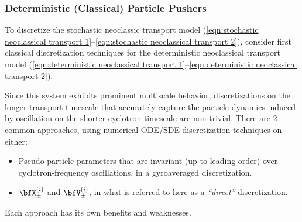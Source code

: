 \subsubsection{Deterministic (Classical) Particle Pushers}
    To discretize the stochastic neoclassic transport model (\ref{eqn:stochastic neoclassical transport 1}--\ref{eqn:stochastic neoclassical transport 2}), consider first classical discretization techniques for the deterministic neoclassical transport model (\ref{eqn:deterministic neoclassical transport 1}--\ref{eqn:deterministic neoclassical transport 2}).
    
    Since this system exhibits prominent multiscale behavior, discretizations on the longer transport timescale that accurately capture the particle dynamics induced by oscillation on the shorter cyclotron timescale are non-trivial. There are 2 common approaches, using numerical ODE/SDE discretization techniques on either:
    \begin{itemize}
        \item  Pseudo-particle parameters that are invariant (up to leading order) over cyclotron-frequency oscillations, in a gyroaveraged discretization.
        \item  $\bfX_{\pm}^{(i)}$ and $\bfV_{\pm}^{(i)}$, in what is referred to here as a \emph{``direct''} discretization.
    \end{itemize}
    Each approach has its own benefits and weaknesses.


    
    
    